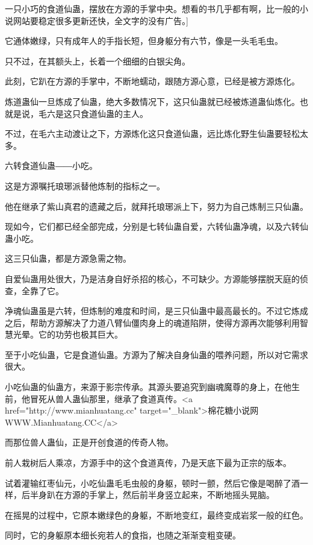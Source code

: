 
\begin{this_body}

一只小巧的食道仙蛊，摆放在方源的手掌中央。想看的书几乎都有啊，比一般的小说网站要稳定很多更新还快，全文字的没有广告。]

它通体嫩绿，只有成年人的手指长短，但身躯分有六节，像是一头毛毛虫。

只不过，在其额头上，长着一个细细的白银尖角。

此刻，它趴在方源的手掌中，不断地蠕动，跟随方源心意，已经是被方源炼化。

炼道蛊仙一旦炼成了仙蛊，绝大多数情况下，这只仙蛊就已经被炼道蛊仙炼化。也就是说，毛六是这只食道仙蛊的主人。

不过，在毛六主动渡让之下，方源炼化这只食道仙蛊，远比炼化野生仙蛊要轻松太多。

六转食道仙蛊――小吃。

这是方源嘱托琅琊派替他炼制的指标之一。

他在继承了紫山真君的遗藏之后，就拜托琅琊派上下，努力为自己炼制三只仙蛊。

现如今，它们都已经全部完成，分别是七转仙蛊自爱，六转仙蛊净魂，以及六转仙蛊小吃。

这三只仙蛊，都是方源急需之物。

自爱仙蛊用处很大，乃是洁身自好杀招的核心，不可缺少。方源能够摆脱天庭的侦查，全靠了它。

净魂仙蛊虽是六转，但炼制的难度和时间，是三只仙蛊中最高最长的。不过它炼成之后，帮助方源解决了力道八臂仙僵肉身上的魂道陷阱，使得方源再次能够利用智慧光晕。它的功劳也极其巨大。

至于小吃仙蛊，它是食道仙蛊。方源为了解决自身仙蛊的喂养问题，所以对它需求很大。

小吃仙蛊的仙蛊方，来源于影宗传承。其源头要追究到幽魂魔尊的身上，在他生前，他冒死从兽人蛊仙那里，继承了食道真传。<a href="http://www.mianhuatang.cc" target="\_blank">棉花糖小说网WWW.Mianhuatang.CC</a>

而那位兽人蛊仙，正是开创食道的传奇人物。

前人栽树后人乘凉，方源手中的这个食道真传，乃是天底下最为正宗的版本。

试着灌输红枣仙元，小吃仙蛊毛毛虫般的身躯，顿时一颤，然后它像是喝醉了酒一样，后半身趴在方源的手掌上，然后前半身竖立起来，不断地摇头晃脑。

在摇晃的过程中，它原本嫩绿色的身躯，不断地变红，最终变成岩浆一般的红色。

同时，它的身躯原本细长宛若人的食指，也随之渐渐变粗变硬。


\end{this_body}
